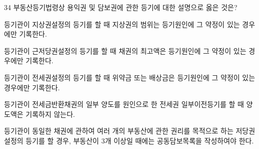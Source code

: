 \begin{question}{34}
부동산등기법령상 용익권 및 담보권에 관한 등기에 대한 설명으로 옳은 것은?
\begin{choices}
  \item 등기관이 지상권설정의 등기를 할 때 지상권의 범위는 등기원인에 그 약정이 있는 경우에만 기록한다.
  \item 등기관이 근저당권설정의 등기를 할 때 채권의 최고액은 등기원인에 그 약정이 있는 경우에만 기록한다.
  \item 등기관이 전세권설정의 등기를 할 때 위약금 또는 배상금은 등기원인에 그 약정이 있는 경우에만 기록한다.
  \item 등기관이 전세금반환채권의 일부 양도를 원인으로 한 전세권 일부이전등기를 할 때 양도액은 기록하지 않는다.
  \item 등기관이 동일한 채권에 관하여 여러 개의 부동산에 관한 권리를 목적으로 하는 저당권설정의 등기를 할 경우, 부동산이 3개 이상일 때에는 공동담보목록을 작성하여야 한다.
\end{choices}
\end{question}
